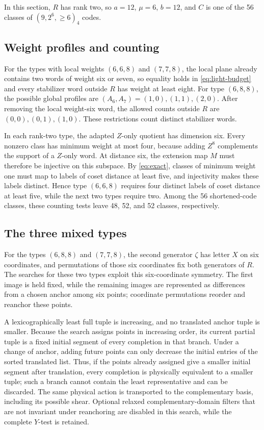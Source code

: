 \documentclass[11pt]{article}
\theoremstyle{definition}
\theoremstyle{remark}
\begin{document}
In this section, \(R\) has rank two, so \(a=12\), \(\mu=6\), \(b=12\),
and \(C\) is one of the 56 classes of \((9,2^6,\geq6)_4\) codes.

\subsection{Weight profiles and counting}

For the types with local weights \((6,6,8)\) and \((7,7,8)\), the local
plane already contains two words of weight six or seven, so equality
holds in \eqref{eq:light-budget} and every stabilizer word outside \(R\)
has weight at least eight. For type \((6,8,8)\), the possible global
profiles are \((A_6,A_7)=(1,0),(1,1),(2,0)\). After removing the local
weight-six word, the allowed counts outside \(R\) are
\((0,0),(0,1),(1,0)\). These restrictions count distinct stabilizer
words.

In each rank-two type, the adapted \(Z\)-only quotient has dimension
six. Every nonzero class has minimum weight at most four, because adding
\(Z^8\) complements the support of a \(Z\)-only word. At distance six,
the extension map \(M\) must therefore be injective on this subspace. By
\eqref{eq:exact}, classes of minimum weight one must map to labels of
coset distance at least five, and injectivity makes these labels
distinct. Hence type \((6,6,8)\) requires four distinct labels of coset
distance at least five, while the next two types require two.
Among the 56 shortened-code classes, these counting tests leave 48, 52,
and 52 classes, respectively.

\subsection{The three mixed types}

For the types \((6,8,8)\) and \((7,7,8)\), the second generator
\(\zeta\) has letter \(X\) on six coordinates, and permutations of those
six coordinates fix both generators of \(R\). The searches for these two
types exploit this six-coordinate symmetry. The first image is held
fixed, while the remaining images are represented as differences from a
chosen anchor among six points; coordinate permutations reorder and
reanchor these points.

A lexicographically least full tuple is increasing, and no translated
anchor tuple is smaller. Because the search assigns points in increasing
order, its current partial tuple is a fixed initial segment of every
completion in that branch. Under a change of anchor, adding future
points can only decrease the initial entries of the sorted translated
list. Thus, if the points already assigned give a smaller initial
segment after translation, every completion is physically equivalent to
a smaller tuple; such a branch cannot contain the least representative
and can be discarded. The same physical action is transported to the
complementary basis, including its possible shear. Optional relaxed
complementary-domain filters that are not invariant under reanchoring
are disabled in this search, while the complete \(Y\)-test is retained.
\end{document}
